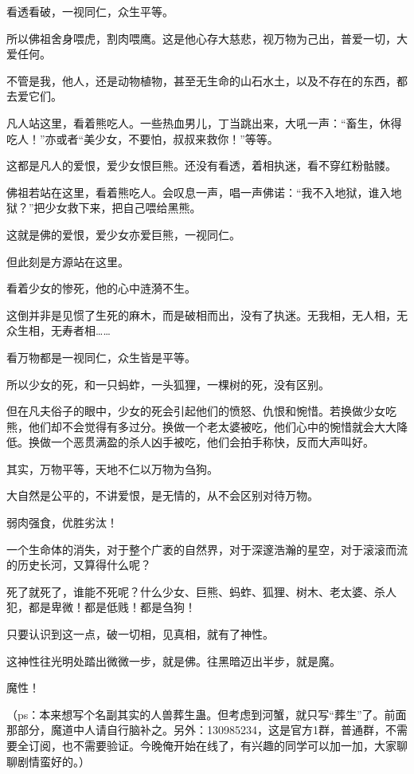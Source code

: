 \begin{this_body}
看透看破，一视同仁，众生平等。

所以佛祖舍身喂虎，割肉喂鹰。这是他心存大慈悲，视万物为己出，普爱一切，大爱任何。

不管是我，他人，还是动物植物，甚至无生命的山石水土，以及不存在的东西，都去爱它们。

凡人站这里，看着熊吃人。一些热血男儿，丁当跳出来，大吼一声：“畜生，休得吃人！”亦或者“美少女，不要怕，叔叔来救你！”等等。

这都是凡人的爱恨，爱少女恨巨熊。还没有看透，着相执迷，看不穿红粉骷髅。

佛祖若站在这里，看着熊吃人。会叹息一声，唱一声佛诺：“我不入地狱，谁入地狱？”把少女救下来，把自己喂给黑熊。

这就是佛的爱恨，爱少女亦爱巨熊，一视同仁。

但此刻是方源站在这里。

看着少女的惨死，他的心中涟漪不生。

这倒并非是见惯了生死的麻木，而是破相而出，没有了执迷。无我相，无人相，无众生相，无寿者相……

看万物都是一视同仁，众生皆是平等。

所以少女的死，和一只蚂蚱，一头狐狸，一棵树的死，没有区别。

但在凡夫俗子的眼中，少女的死会引起他们的愤怒、仇恨和惋惜。若换做少女吃熊，他们却不会觉得有多过分。换做一个老太婆被吃，他们心中的惋惜就会大大降低。换做一个恶贯满盈的杀人凶手被吃，他们会拍手称快，反而大声叫好。

其实，万物平等，天地不仁以万物为刍狗。

大自然是公平的，不讲爱恨，是无情的，从不会区别对待万物。

弱肉强食，优胜劣汰！

一个生命体的消失，对于整个广袤的自然界，对于深邃浩瀚的星空，对于滚滚而流的历史长河，又算得什么呢？

死了就死了，谁能不死呢？什么少女、巨熊、蚂蚱、狐狸、树木、老太婆、杀人犯，都是卑微！都是低贱！都是刍狗！

只要认识到这一点，破一切相，见真相，就有了神性。

这神性往光明处踏出微微一步，就是佛。往黑暗迈出半步，就是魔。

魔性！

（ps：本来想写个名副其实的人兽葬生蛊。但考虑到河蟹，就只写“葬生”了。前面那部分，魔道中人请自行脑补之。另外：130985234，这是官方1群，普通群，不需要全订阅，也不需要验证。今晚俺开始在线了，有兴趣的同学可以加一加，大家聊聊剧情蛮好的。）

\end{this_body}


